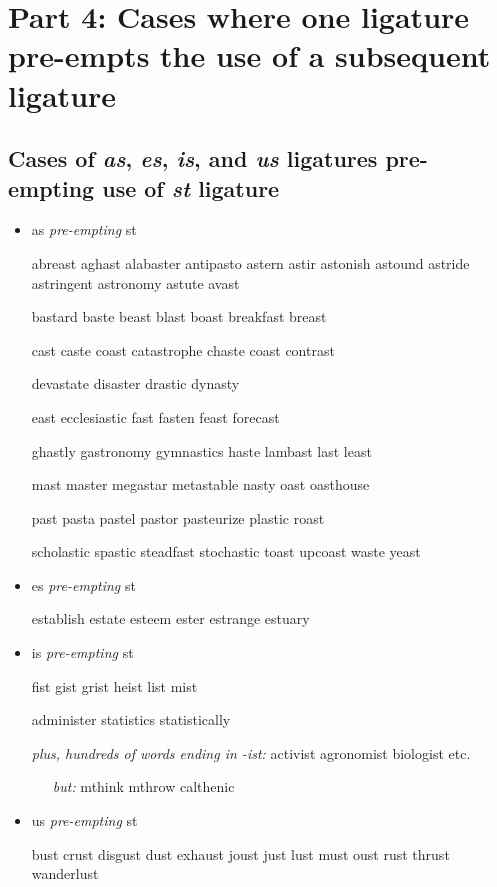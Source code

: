 \section*{Part 4: Cases where one ligature pre-empts the use of a subsequent ligature}

\subsection*{Cases of \emph{as}, {\ebg \emph{es}}, \emph{is}, and \emph{us} ligatures pre-empting use of \emph{st} ligature}

\bgroup \em

\begin{itemize}
\item as \emph{pre-empting} st

abreast aghast alabaster antipasto astern astir astonish astound astride astringent astronomy astute avast

bastard baste beast blast boast breakfast breast 

cast caste coast catastrophe chaste coast contrast 

devastate disaster drastic dynasty 

east ecclesiastic fast fasten feast forecast 

ghastly gastronomy gymnastics haste lambast last least 

mast master megastar metastable nasty oast oasthouse

past pasta pastel pastor pasteurize plastic roast 

scholastic spastic steadfast stochastic toast upcoast waste yeast

\item {\ebg es} \emph{pre-empting} st

{\ebg
establish
estate
esteem
ester
estrange
estuary
}




\item is \emph{pre-empting} st

fist gist grist heist list mist 

administer statistics statistically

\emph{plus, \emph{hundreds} of words ending in -ist:}
activist agronomist biologist etc.

\ \ \ \emph{but:} mthink mthrow calthenic



\item us \emph{pre-empting} st

bust crust disgust dust exhaust joust just lust must oust rust thrust wanderlust


\end{itemize}
\egroup


